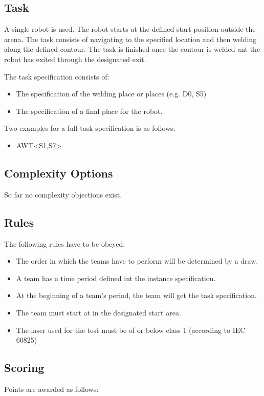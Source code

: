 \subsection{Task}
A single robot is used. The robot starts at the defined start position outside the arena. The task consists of navigating to the specified location and then welding along the defined contour. The task is finished once the contour is welded ant the robot has exited through the designated exit.
\par
The task specification consists of: 
\begin{itemize}
	\item The specification of the welding place or places (e.g. D0, S5)
	\item The specification of a final place for the robot.
\end{itemize}

Two examples for a full task specification is as follows:
\begin{itemize}
	\item AWT\textless S1,S7\textgreater 
\end{itemize}


\subsection{Complexity Options}

So far no complexity objections exist.

\subsection{Rules}
The following rules have to be obeyed:

\begin{itemize}
\item The order in which the teams have to perform will be determined by a draw.
\item A team has a time period defined int the instance specification.
\item At the beginning of a team’s period, the team will get the task specification. 
\item The team must start at in the designated start area.
\item The laser used for the test must be of or below class 1 (according to IEC 60825)
\end{itemize}


\subsection{Scoring}
Points are awarded as follows:

